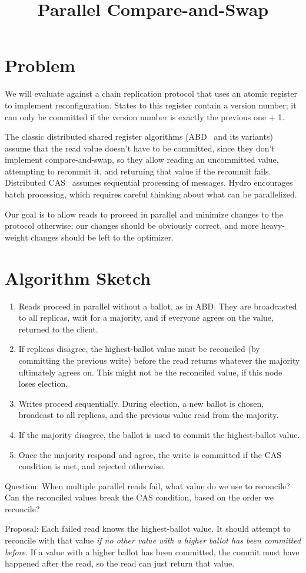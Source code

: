 \documentclass{article}
\title{Parallel Compare-and-Swap}
\date{}
\author{}
\begin{document}
\maketitle

\section{Problem}
We will evaluate against a chain replication protocol that uses an atomic register to implement reconfiguration.
States to this register contain a version number; it can only be committed if the version number is exactly the previous one + 1.

The classic distributed shared register algorithms (ABD~\cite{abd} and its variants) assume that the read value doesn't have to be committed, since they don't implement compare-and-swap, so they allow reading an uncommitted value, attempting to recommit it, and returning that value if the recommit fails.
Distributed CAS~\cite{caspaxos} assumes sequential processing of messages.
Hydro encourages batch processing, which requires careful thinking about what can be parallelized.

Our goal is to allow reads to proceed in parallel and minimize changes to the protocol otherwise; our changes should be obviously correct, and more heavy-weight changes should be left to the optimizer.

\section{Algorithm Sketch}
\begin{enumerate}
  \item Reads proceed in parallel without a ballot, as in ABD. They are broadcasted to all replicas, wait for a majority, and if everyone agrees on the value, returned to the client.
  \item If replicas disagree, the highest-ballot value must be reconciled (by committing the previous write) before the read returns whatever the majority ultimately agrees on. This might not be the reconciled value, if this node loses election.
  \item Writes proceed sequentially. During election, a new ballot is chosen, broadcast to all replicas, and the previous value read from the majority.
  \item If the majority disagree, the ballot is used to commit the highest-ballot value.
  \item Once the majority respond and agree, the write is committed if the CAS condition is met, and rejected otherwise.
\end{enumerate}

Question: When multiple parallel reads fail, what value do we use to reconcile?
Can the reconciled values break the CAS condition, based on the order we reconcile?

Proposal: Each failed read knows the highest-ballot value. It should attempt to reconcile with that value \emph{if no other value with a higher ballot has been committed before}.
If a value with a higher ballot has been committed, the commit must have happened after the read, so the read can just return that value.




\end{document}

